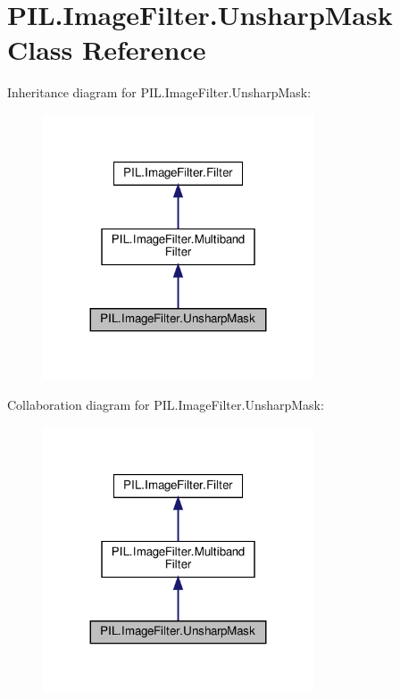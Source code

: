 \hypertarget{classPIL_1_1ImageFilter_1_1UnsharpMask}{}\section{P\+I\+L.\+Image\+Filter.\+Unsharp\+Mask Class Reference}
\label{classPIL_1_1ImageFilter_1_1UnsharpMask}


Inheritance diagram for P\+I\+L.\+Image\+Filter.\+Unsharp\+Mask\+:
\nopagebreak
\begin{figure}[H]
\begin{center}
\leavevmode
\includegraphics[width=227pt]{classPIL_1_1ImageFilter_1_1UnsharpMask__inherit__graph}
\end{center}
\end{figure}


Collaboration diagram for P\+I\+L.\+Image\+Filter.\+Unsharp\+Mask\+:
\nopagebreak
\begin{figure}[H]
\begin{center}
\leavevmode
\includegraphics[width=227pt]{classPIL_1_1ImageFilter_1_1UnsharpMask__coll__graph}
\end{center}
\end{figure}

